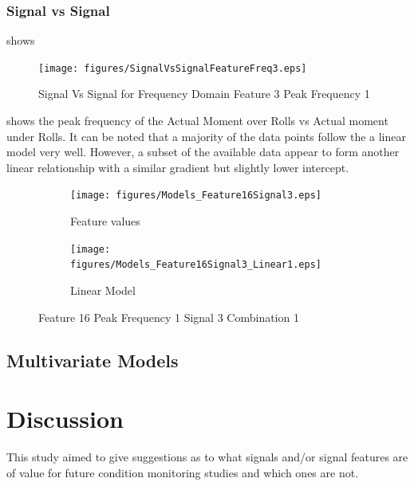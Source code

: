 \documentclass[]{article}
\begin{document}
\subsubsection*{Signal vs Signal}
 shows 
\begin{figure}[H]
    \centering
    \texttt{[image: figures/SignalVsSignalFeatureFreq3.eps]}
    \caption{Signal Vs Signal for Frequency Domain Feature 3 Peak Frequency 1}
    \label{fig:SignalVsSignalFeatureFreq3}
\end{figure}
 shows the peak frequency of the Actual Moment over Rolls vs Actual moment under Rolls. It can be noted that a majority of the data points follow the a linear model very well. However, a subset of the available data appear to form another linear relationship with a similar gradient but slightly lower intercept.
\begin{figure}[H]
	\centering
	\begin{subfigure}{.5\textwidth}
		\centering
    		\texttt{[image: figures/Models\_Feature16Signal3.eps]}
	 	\caption{Feature values}
	  	\label{fig:Models_Feature16Signal3}
	\end{subfigure}%
	\begin{subfigure}{.5\textwidth}
	  \centering
 	   	\texttt{[image: figures/Models\_Feature16Signal3\_Linear1.eps]}
	  	\caption{Linear Model}
	  	\label{fig:Models_Feature16Signal3_Linear1}
	\end{subfigure}
   	\caption{Feature 16 Peak Frequency 1 Signal 3 Combination 1}
    \label{fig:Models_Feature16Signal3_Caption}
\end{figure}

\subsection{Multivariate Models}

\clearpage 

\section{Discussion}

This study aimed to give suggestions as to what signals and/or signal features are of value for future condition monitoring studies and which ones are not.
\end{document}
